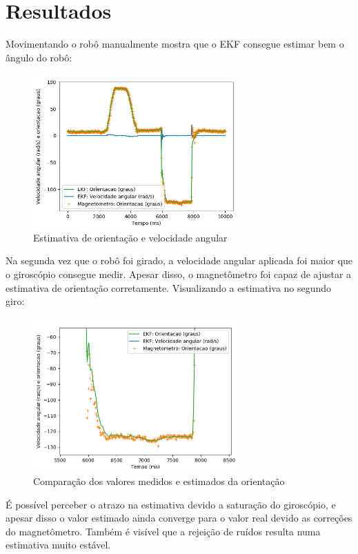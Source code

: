 \documentclass[
	12pt,				%
	openright,			%
	twoside,			%
	convert,
	a4paper,			%
	english,			%
	french,				%
	spanish,			%
	brazil				%
	]{abntex2}
\begin{document}
\chapter{Resultados}
Movimentando o robô manualmente mostra que o EKF consegue estimar bem o ângulo do robô:
\begin{figure}[H]
	\caption{Estimativa de orientação e velocidade angular}
\begin{center}
   \includegraphics[width=0.7\textwidth]{ekf_theta}
\end{center}
\end{figure}
Na segunda vez que o robô foi girado, a velocidade angular aplicada foi maior que o giroscópio consegue medir. Apesar disso, o magnetômetro foi capaz de ajustar a estimativa de orientação corretamente. Visualizando a estimativa no segundo giro:
\begin{figure}[H]
	\caption{Comparação dos valores medidos e estimados da orientação}
\begin{center}
   \includegraphics[width=0.7\textwidth]{ekf_theta_proximo}
\end{center}
\end{figure}
É possível perceber o atrazo na estimativa devido a saturação do giroscópio, e apesar disso o valor estimado ainda converge para o valor real devido as correções do magnetômetro. Também é visível que a rejeição de ruídos resulta numa estimativa muito estável.
\end{document}
